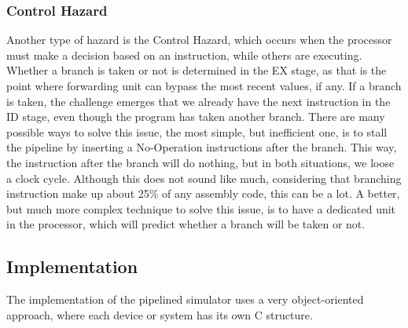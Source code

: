 \subsubsection{Control Hazard}
Another type of hazard is the Control Hazard, which occurs when the processor
must make a decision based on an instruction, while others are executing.
Whether a branch is taken or not is determined in the EX stage, as that is the
point where forwarding unit can bypass the most recent values, if any. If a
branch is taken, the challenge emerges that we already have the next instruction in
the ID stage, even though the program has taken another branch. There are many
possible ways to solve this issue, the most simple, but inefficient one, is to
stall the pipeline by inserting a No-Operation instructions after the branch. This way,
the instruction after the branch will do nothing, but in both situations, we
loose a clock cycle. Although this does not sound like much, considering that
branching instruction make up about 25\% of any assembly
code\cite{instruction_frequency}, this can be a lot.
A better, but much more complex technique to solve this issue, is to have a
dedicated unit in the processor, which will predict whether a branch will be
taken or not.


\subsection{Implementation}
The implementation of the pipelined simulator uses a very object-oriented
approach, where each device or system has its own C structure.

